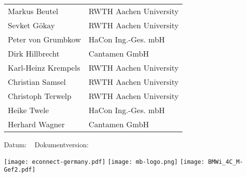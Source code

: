\begin{titlepage}

\begin{huge}
\bfseries\center
\thistitle

\end{huge}

\vspace{1em}

\begin{large}
\bfseries\noindent
\begin{tabular}{@{}ll@{}}
  Markus Beutel & RWTH Aachen University \\
  Sevket Gökay & RWTH Aachen University \\
  Peter von Grumbkow & HaCon Ing.-Ges. mbH \\
  Dirk Hillbrecht & Cantamen GmbH \\
  Karl-Heinz Krempels & RWTH Aachen University \\
  Christian Samsel & RWTH Aachen University \\
  Christoph Terwelp & RWTH Aachen University \\
  Heike Twele & HaCon Ing.-Ges. mbH \\
  Herhard Wagner & Cantamen GmbH \\
\end{tabular}


\end{large}

\vspace{2em}

Datum: \thisdate ~ Dokumentversion: \thisversion

\vspace{2em}

\thisabstract
\vspace{2em}
\vfill

\texttt{[image: econnect-germany.pdf]} \hspace{1.5em}
\texttt{[image: mb-logo.png]}
\hfill \texttt{[image: BMWi\_4C\_M-Gef2.pdf]}


\end{titlepage}
